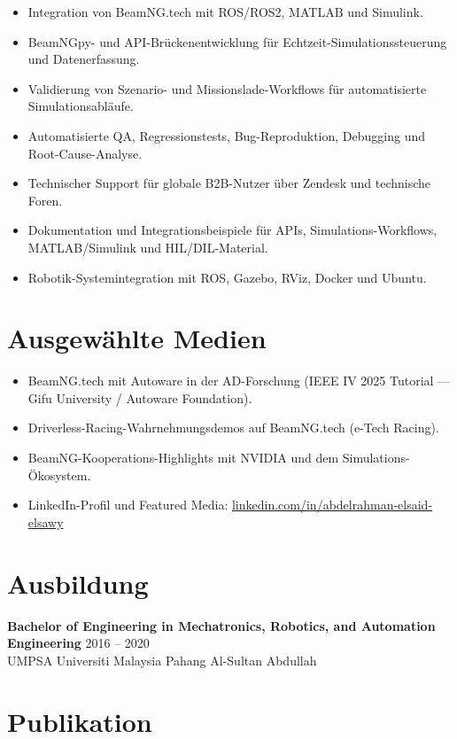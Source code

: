 \documentclass[11pt,a4paper]{article}
\begin{document}
\begin{itemize}
    \item Integration von BeamNG.tech mit ROS/ROS2, MATLAB und Simulink.
    \item BeamNGpy- und API-Brückenentwicklung für Echtzeit-Simulationssteuerung und Datenerfassung.
    \item Validierung von Szenario- und Missionslade-Workflows für automatisierte Simulationsabläufe.
    \item Automatisierte QA, Regressionstests, Bug-Reproduktion, Debugging und Root-Cause-Analyse.
    \item Technischer Support für globale B2B-Nutzer über Zendesk und technische Foren.
    \item Dokumentation und Integrationsbeispiele für APIs, Simulations-Workflows, MATLAB/Simulink und HIL/DIL-Material.
    \item Robotik-Systemintegration mit ROS, Gazebo, RViz, Docker und Ubuntu.
\end{itemize}

\section*{Ausgewählte Medien}

\begin{itemize}
    \item BeamNG.tech mit Autoware in der AD-Forschung (IEEE IV 2025 Tutorial — Gifu University / Autoware Foundation).
    \item Driverless-Racing-Wahrnehmungsdemos auf BeamNG.tech (e-Tech Racing).
    \item BeamNG-Kooperations-Highlights mit NVIDIA und dem Simulations-Ökosystem.
    \item LinkedIn-Profil und Featured Media: \href{https://www.linkedin.com/in/abdelrahman-elsaid-elsawy}{linkedin.com/in/abdelrahman-elsaid-elsawy}
\end{itemize}

\section*{Ausbildung}

\textbf{\color{PrimaryColor}Bachelor of Engineering in Mechatronics, Robotics, and Automation Engineering}
\hfill 2016 -- 2020\\
UMPSA Universiti Malaysia Pahang Al-Sultan Abdullah

\section*{Publikation}
\end{document}
